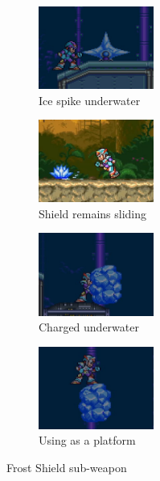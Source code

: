 \begin{figure}[htp]
\begin{subfigure}{3.9cm}
		\includegraphics[height=2.7cm]{figures/X3/weapons/F_shield_3.png}
		\caption{Ice spike underwater}	
	\end{subfigure}
	\begin{subfigure}{3.9cm}
		\centering
		\includegraphics[height=2.7cm]{figures/X3/weapons/F_shield_C_1.png}
		\caption{Shield remains sliding}	
	\end{subfigure}

	\begin{subfigure}{3.9cm}
		\centering
		\includegraphics[height=2.7cm]{figures/X3/weapons/F_shield_C_2.png}
		\caption{Charged underwater }	
	\end{subfigure}
	\begin{subfigure}{3.9cm}
		\centering
		
		\includegraphics[height=2.7cm]{figures/X3/weapons/F_shield_C_3.png}
		\caption{Using as a platform}	
	\end{subfigure}
	\caption{Frost Shield sub-weapon}
\end{figure}



